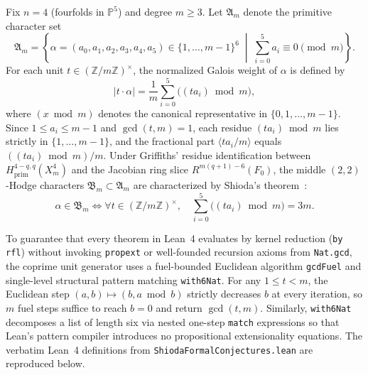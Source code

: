 \documentclass[11pt,a4paper]{article}
\begin{document}
Fix $n = 4$ (fourfolds in $\mathbb{P}^5$) and degree $m \ge 3$. Let $\mathfrak{A}_m$ denote the primitive character set
\begin{equation}
  \mathfrak{A}_m = \left\{ \alpha = (a_0, a_1, a_2, a_3, a_4, a_5) \in \{1, \dots, m-1\}^6 \;\middle|\; \sum_{i=0}^5 a_i \equiv 0 \pmod{m} \right\}.
\end{equation}
For each unit $t \in (\mathbb{Z}/m\mathbb{Z})^\times$, the normalized Galois weight of $\alpha$ is defined by
\begin{equation}
  |t \cdot \alpha| = \frac{1}{m} \sum_{i=0}^5 \bigl((t a_i) \bmod m\bigr),
\end{equation}
where $(x \bmod m)$ denotes the canonical representative in $\{0, 1, \dots, m-1\}$. Since $1 \le a_i \le m-1$ and $\gcd(t, m) = 1$, each residue $(t a_i) \bmod m$ lies strictly in $\{1, \dots, m-1\}$, and the fractional part $\langle t a_i / m \rangle$ equals $((t a_i) \bmod m) / m$. Under Griffiths' residue identification between $H^{4-q, q}_{\mathrm{prim}}(X_m^4)$ and the Jacobian ring slice $R^{m(q+1)-6}(F_0)$, the middle $(2,2)$-Hodge characters $\mathfrak{B}_m \subset \mathfrak{A}_m$ are characterized by Shioda's theorem~\cite{Shioda1979}:
\begin{equation}
  \alpha \in \mathfrak{B}_m \iff \forall t \in (\mathbb{Z}/m\mathbb{Z})^\times, \quad \sum_{i=0}^5 \bigl((t a_i) \bmod m\bigr) = 3m.
\end{equation}

To guarantee that every theorem in Lean~4 evaluates by kernel reduction (\texttt{by rfl}) without invoking \texttt{propext} or well-founded recursion axioms from \texttt{Nat.gcd}, the coprime unit generator uses a fuel-bounded Euclidean algorithm \texttt{gcdFuel} and single-level structural pattern matching \texttt{with6Nat}. For any $1 \le t < m$, the Euclidean step $(a, b) \mapsto (b, a \bmod b)$ strictly decreases $b$ at every iteration, so $m$ fuel steps suffice to reach $b = 0$ and return $\gcd(t, m)$. Similarly, \texttt{with6Nat} decomposes a list of length six via nested one-step \texttt{match} expressions so that Lean's pattern compiler introduces no propositional extensionality equations. The verbatim Lean~4 definitions from \texttt{ShiodaFormalConjectures.lean} are reproduced below.
\end{document}
